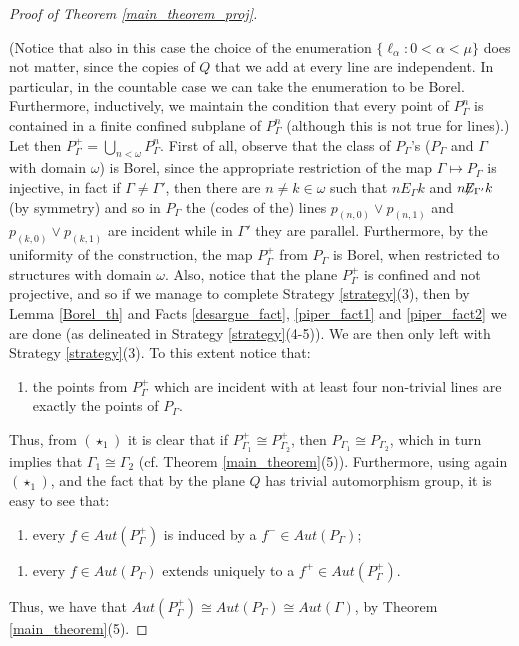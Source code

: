 \documentclass{amsart}
\numberwithin{claimcounter}{theorem}
\begin{document}
\begin{proof}[Proof of Theorem \ref{main_theorem_proj}]
\begin{enumerate}[(i)]
\end{enumerate}
(Notice that also in this case the choice of the enumeration $\{ \ell_{\alpha} : 0 < \alpha < \mu \}$ does not matter, since the copies of $Q$ that we add at every line are independent. In particular, in the countable case we can take the enumeration to be Borel. Furthermore, inductively, we maintain the condition that every point of $P^n_{\Gamma}$ is contained in a finite confined subplane of $P^n_{\Gamma}$ (although this is not true for lines).)
\newline Let then $P^+_{\Gamma} = \bigcup_{n < \omega} P^n_{\Gamma}$. First of all, observe that the class of $P_{\Gamma}$'s ($P_\Gamma$ and $\Gamma$ with domain $\omega$) is Borel, since the appropriate restriction of the map $\Gamma \mapsto P_{\Gamma}$ is injective, in fact if $\Gamma  \neq \Gamma'$, then there are $n \neq k \in \omega$ such that $n E_{\Gamma} k$ and $n \!\!\not\!\!E_{\Gamma'} k$ (by symmetry) and so in $P_{\Gamma}$ the (codes of the) lines $p_{(n, 0)} \vee p_{(n, 1)}$ and $p_{(k, 0)} \vee p_{(k, 1)}$ are incident while in $\Gamma'$ they are parallel. Furthermore, by the uniformity of the construction, the map $P^+_{\Gamma}$ from $P_{\Gamma}$ is Borel, when restricted to structures with domain $\omega$. Also, notice that the plane $P^+_{\Gamma}$ is confined and not projective, and so if we manage to complete Strategy \ref{strategy}(3), then by Lemma \ref{Borel_th} and Facts \ref{desargue_fact}, \ref{piper_fact1} and \ref{piper_fact2} we are done (as delineated in Strategy \ref{strategy}(4-5)). We are then only left with Strategy \ref{strategy}(3). To this extent notice that:
\begin{enumerate}[$(\star_1)$]
	\item the points from $P^+_{\Gamma}$ which are incident with at least four non-trivial lines are exactly the points of $P_{\Gamma}$.
\end{enumerate} 
Thus, from $(\star_1)$ it is clear that if $P^+_{\Gamma_1} \cong P^+_{\Gamma_2}$, then $P_{\Gamma_1} \cong P_{\Gamma_2}$, which in turn implies that $\Gamma_1 \cong \Gamma_2$ (cf. Theorem \ref{main_theorem}(5)). Furthermore, using again $(\star_1)$, and the fact that by \cite[Lemma 1]{projective} the plane $Q$ has trivial automorphism group, it is easy to see that:
\begin{enumerate}[$(\star_2)$]
	\item every $f \in Aut(P^+_{\Gamma})$ is induced by a $f^- \in Aut(P_{\Gamma})$;
\end{enumerate} 
\begin{enumerate}[$(\star_3)$]
	\item every $f \in Aut(P_{\Gamma})$ extends uniquely to a $f^+ \in Aut(P^+_{\Gamma})$.
\end{enumerate} 
Thus, we have that $Aut(P^+_{\Gamma}) \cong Aut(P_{\Gamma}) \cong Aut(\Gamma)$, by Theorem \ref{main_theorem}(5).
\end{proof}
\end{document}
